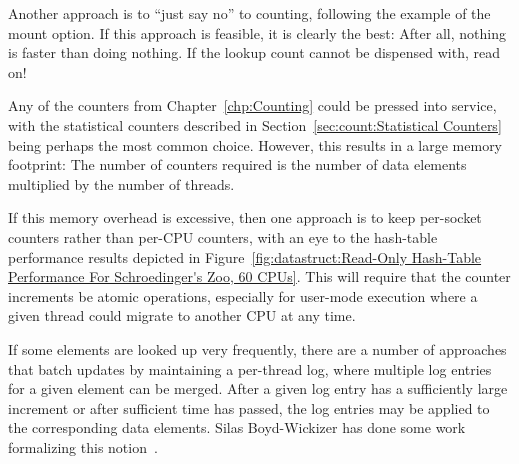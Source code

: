 Another approach is to ``just say no'' to counting, following the example
of the  mount option.
If this approach is feasible, it is clearly the best:  After all, nothing
is faster than doing nothing.
If the lookup count cannot be dispensed with, read on!

Any of the counters from
Chapter~\ref{chp:Counting}
could be pressed into service, with the statistical counters described in
Section~\ref{sec:count:Statistical Counters}
being perhaps the most common choice.
However, this results in a large memory footprint: The number of counters
required is the number of data elements multiplied by the number of
threads.

If this memory overhead is excessive, then one approach is to keep
per-socket counters rather than per-CPU counters,
with an eye to the hash-table performance results depicted in
Figure~\ref{fig:datastruct:Read-Only Hash-Table Performance For Schroedinger's Zoo, 60 CPUs}.
This will require that the counter increments be atomic operations,
especially for user-mode execution where a given thread could migrate
to another CPU at any time.

If some elements are looked up very frequently, there are a number
of approaches that batch updates by maintaining a per-thread log,
where multiple log entries for a given element can be merged.
After a given log entry has a sufficiently large increment or after
sufficient time has passed, the log entries may be applied to the
corresponding data elements.
Silas Boyd-Wickizer has done some work formalizing this
notion~\cite{SilasBoydWickizerPhD}.
